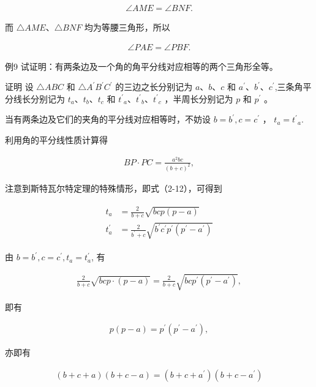 \documentclass[10pt]{article}
\begin{document}
\begin{align*}
\angle A M E=\angle B N F .
\end{align*}

而 $\triangle A M E 、 \triangle B N F$ 均为等腰三角形，所以

\begin{align*}
\angle P A E=\angle P B F .
\end{align*}

例9 试证明：有两条边及一个角的角平分线对应相等的两个三角形全等。

证明 设 $\triangle A B C$ 和 $\triangle A^{\prime} B^{\prime} C^{\prime}$ 的三边之长分别记为 $a 、 b 、 c$ 和 $a^{\prime} 、 b^{\prime} 、 c^{\prime}$,三条角平分线长分别记为 $t_{a} 、 t_{b} 、 t_{c}$ 和 $t^{\prime}{ }_{a} 、 t^{\prime}{ }_{b} 、 t^{\prime}{ }_{c}$ ，半周长分别记为 $p$ 和 $p^{\prime}$ 。

当有两条边及它们的夹角的平分线对应相等时，不妨设 $b=b^{\prime}, c=c^{\prime}$ ， $t_{a}=t^{\prime}{ }_{a}$.

利用角的平分线性质计算得

\begin{align*}
B P \cdot P C=\frac{a^{2} b c}{(b+c)^{2}},
\end{align*}

注意到斯特瓦尔特定理的特殊情形，即式（2-12），可得到

\begin{align*}
\begin{aligned}
t_{a} & =\frac{2}{b+c} \sqrt{b c p(p-a)} \\
t_{a}^{\prime} & =\frac{2}{b^{\prime}+c} \sqrt{b^{\prime} c^{\prime} p^{\prime}\left(p^{\prime}-a^{\prime}\right)}
\end{aligned}
\end{align*}

由 $b=b^{\prime}, c=c^{\prime}, t_{a}=t_{a}^{\prime}$, 有

\begin{align*}
\frac{2}{b+c} \sqrt{b c p \cdot(p-a)}=\frac{2}{b+c} \sqrt{b c p^{\prime}\left(p^{\prime}-a^{\prime}\right)},
\end{align*}

即有

\begin{align*}
p(p-a)=p^{\prime}\left(p^{\prime}-a^{\prime}\right),
\end{align*}

亦即有

\begin{align*}
(b+c+a)(b+c-a)=\left(b+c+a^{\prime}\right)\left(b+c-a^{\prime}\right)
\end{align*}
\end{document}

